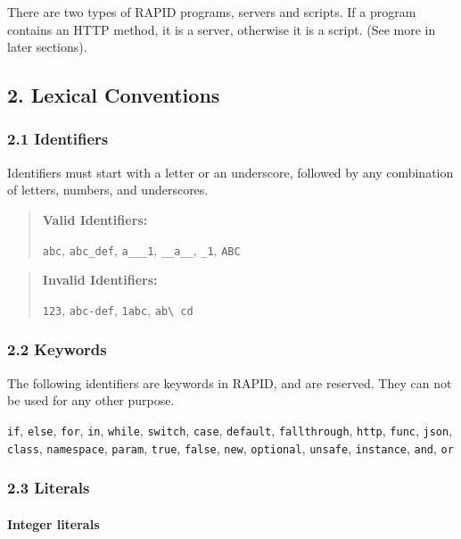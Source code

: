 \documentclass[]{article}
\begin{document}
There are two types of RAPID programs, servers and scripts. If a program
contains an HTTP method, it is a server, otherwise it is a script. (See
more in later sections).

\subsection{2. Lexical Conventions}\label{lexical-conventions}

\subsubsection{2.1 Identifiers}\label{identifiers}

Identifiers must start with a letter or an underscore, followed by any
combination of letters, numbers, and underscores.

\begin{quote}
\textbf{Valid Identifiers:}

\texttt{abc}, \texttt{abc\_def}, \texttt{a\_\_\_1}, \texttt{\_\_a\_\_},
\texttt{\_1}, \texttt{ABC}
\end{quote}

\begin{quote}
\textbf{Invalid Identifiers:}

\texttt{123}, \texttt{abc-def}, \texttt{1abc},
\texttt{ab\textbackslash{} cd}
\end{quote}

\subsubsection{2.2 Keywords}\label{keywords}

The following identifiers are keywords in RAPID, and are reserved. They
can not be used for any other purpose.

\texttt{if}, \texttt{else}, \texttt{for}, \texttt{in}, \texttt{while},
\texttt{switch}, \texttt{case}, \texttt{default}, \texttt{fallthrough},
\texttt{http}, \texttt{func}, \texttt{json}, \texttt{class},
\texttt{namespace}, \texttt{param}, \texttt{true}, \texttt{false},
\texttt{new}, \texttt{optional}, \texttt{unsafe}, \texttt{instance},
\texttt{and}, \texttt{or}

\subsubsection{2.3 Literals}\label{literals}

\paragraph{Integer literals}\label{integer-literals}
\end{document}
